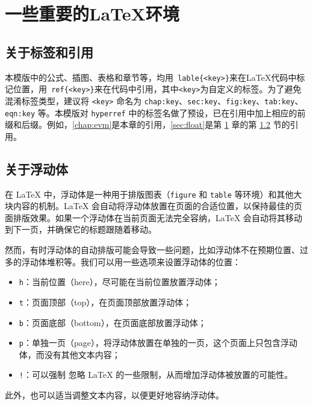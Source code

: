 \chapter{一些重要的\LaTeX{}环境}\label{chap:evm}

\section{关于标签和引用}

本模版中的公式、插图、表格和章节等，均用\texttt{ lable\{<key>\}}来在\LaTeX{}代码中标记位置，用\texttt{ ref\{<key>\}}来在代码中引用，其中\texttt{<key>}为自定义的标签。为了避免混淆标签类型，建议将 \texttt{<key>} 命名为 \texttt{chap:key}、\texttt{sec:key}、\texttt{fig:key}、\texttt{tab:key}、\texttt{eqn:key} 等。本模版对 \texttt{hyperref} 中的标签名做了预设，已在引用中加上相应的前缀和后缀。例如，\autoref{chap:evm}是本章的引用，\autoref{sec:float}是第 \ref{chap:evm} 章的第 \ref{sec:float} 节的引用。

\section{关于浮动体}\label{sec:float}

在 \LaTeX{} 中，浮动体是一种用于排版图表（\texttt{figure} 和 \texttt{table} 等环境）和其他大块内容的机制。\LaTeX{} 会自动将浮动体放置在页面的合适位置，以保持最佳的页面排版效果。如果一个浮动体在当前页面无法完全容纳，\LaTeX{} 会自动将其移动到下一页，并确保它的标题跟随着移动。

然而，有时浮动体的自动排版可能会导致一些问题，比如浮动体不在预期位置、过多的浮动体堆积等。我们可以用一些选项来设置浮动体的位置： 
\begin{itemize}
    \item \texttt{h}：当前位置（here），尽可能在当前位置放置浮动体；
    \item \texttt{t}：页面顶部（top），在页面顶部放置浮动体；
    \item \texttt{b}：页面底部（bottom），在页面底部放置浮动体；
    \item \texttt{p}：单独一页（page），将浮动体放置在单独的一页，这个页面上只包含浮动体，而没有其他文本内容；
    \item \texttt{!}：可以强制 忽略 \LaTeX{} 的一些限制，从而增加浮动体被放置的可能性。
\end{itemize}
此外，也可以适当调整文本内容，以便更好地容纳浮动体。

